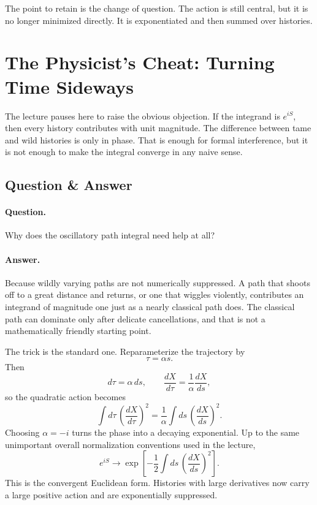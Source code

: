 The point to retain is the change of question. The action is still central, but it is no longer minimized directly. It is exponentiated and then summed over histories.

\section{The Physicist's Cheat: Turning Time Sideways}

The lecture pauses here to raise the obvious objection. If the integrand is \(e^{iS}\), then every history contributes with unit magnitude. The difference between tame and wild histories is only in phase. That is enough for formal interference, but it is not enough to make the integral converge in any naive sense.

\subsection{Question \& Answer}

\paragraph{Question.} Why does the oscillatory path integral need help at all?

\paragraph{Answer.} Because wildly varying paths are not numerically suppressed. A path that shoots off to a great distance and returns, or one that wiggles violently, contributes an integrand of magnitude one just as a nearly classical path does. The classical path can dominate only after delicate cancellations, and that is not a mathematically friendly starting point.

The trick is the standard one. Reparameterize the trajectory by
\begin{equation}
\tau=\alpha s.
\end{equation}
Then
\begin{equation}
d\tau=\alpha\,ds,
\qquad
\frac{dX}{d\tau}=\frac{1}{\alpha}\frac{dX}{ds},
\end{equation}
so the quadratic action becomes
\begin{equation}
\int d\tau\,\left(\frac{dX}{d\tau}\right)^2
=
\frac{1}{\alpha}\int ds\,\left(\frac{dX}{ds}\right)^2.
\end{equation}
Choosing \(\alpha=-i\) turns the phase into a decaying exponential. Up to the same unimportant overall normalization conventions used in the lecture,
\begin{equation}
e^{iS}
\longrightarrow
\exp\!\left[-\frac12\int ds\,\left(\frac{dX}{ds}\right)^2\right].
\end{equation}
This is the convergent Euclidean form. Histories with large derivatives now carry a large positive action and are exponentially suppressed.

